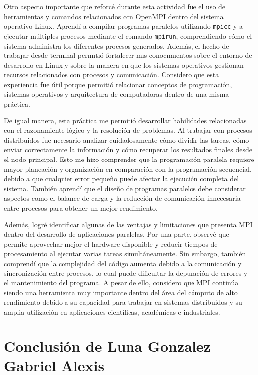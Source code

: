 Otro aspecto importante que reforcé durante esta actividad fue el uso de herramientas y comandos relacionados con OpenMPI dentro del sistema operativo Linux. Aprendí a compilar programas paralelos utilizando \texttt{mpicc} y a ejecutar múltiples procesos mediante el comando \texttt{mpirun}, comprendiendo cómo el sistema administra los diferentes procesos generados. Además, el hecho de trabajar desde terminal permitió fortalecer mis conocimientos sobre el entorno de desarrollo en Linux y sobre la manera en que los sistemas operativos gestionan recursos relacionados con procesos y comunicación. Considero que esta experiencia fue útil porque permitió relacionar conceptos de programación, sistemas operativos y arquitectura de computadoras dentro de una misma práctica.

De igual manera, esta práctica me permitió desarrollar habilidades relacionadas con el razonamiento lógico y la resolución de problemas. Al trabajar con procesos distribuidos fue necesario analizar cuidadosamente cómo dividir las tareas, cómo enviar correctamente la información y cómo recuperar los resultados finales desde el nodo principal. Esto me hizo comprender que la programación paralela requiere mayor planeación y organización en comparación con la programación secuencial, debido a que cualquier error pequeño puede afectar la ejecución completa del sistema. También aprendí que el diseño de programas paralelos debe considerar aspectos como el balance de carga y la reducción de comunicación innecesaria entre procesos para obtener un mejor rendimiento.

Además, logré identificar algunas de las ventajas y limitaciones que presenta MPI dentro del desarrollo de aplicaciones paralelas. Por una parte, observé que permite aprovechar mejor el hardware disponible y reducir tiempos de procesamiento al ejecutar varias tareas simultáneamente. Sin embargo, también comprendí que la complejidad del código aumenta debido a la comunicación y sincronización entre procesos, lo cual puede dificultar la depuración de errores y el mantenimiento del programa. A pesar de ello, considero que MPI continúa siendo una herramienta muy importante dentro del área del cómputo de alto rendimiento debido a su capacidad para trabajar en sistemas distribuidos y su amplia utilización en aplicaciones científicas, académicas e industriales.

\newpage
\section{Conclusión de Luna Gonzalez Gabriel Alexis}

